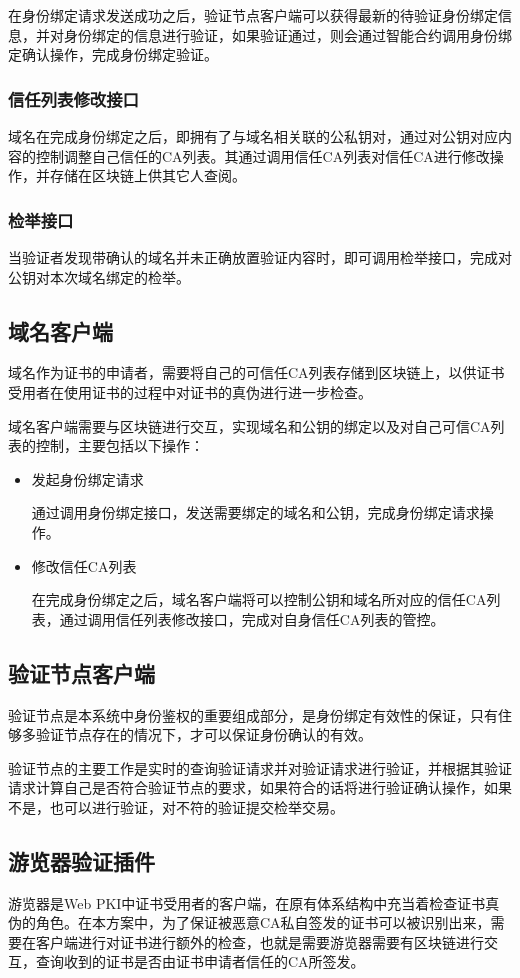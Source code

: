 在身份绑定请求发送成功之后，验证节点客户端可以获得最新的待验证身份绑定信息，并对身份绑定的信息进行验证，如果验证通过，则会通过智能合约调用身份绑定确认操作，完成身份绑定验证。

\subsubsection{信任列表修改接口}

域名在完成身份绑定之后，即拥有了与域名相关联的公私钥对，通过对公钥对应内容的控制调整自己信任的CA列表。其通过调用信任CA列表对信任CA进行修改操作，并存储在区块链上供其它人查阅。


\subsubsection{检举接口}

当验证者发现带确认的域名并未正确放置验证内容时，即可调用检举接口，完成对公钥对本次域名绑定的检举。

\subsection{域名客户端}

域名作为证书的申请者，需要将自己的可信任CA列表存储到区块链上，以供证书受用者在使用证书的过程中对证书的真伪进行进一步检查。

域名客户端需要与区块链进行交互，实现域名和公钥的绑定以及对自己可信CA列表的控制，主要包括以下操作：

\begin{itemize}
	\item 

	发起身份绑定请求

	通过调用身份绑定接口，发送需要绑定的域名和公钥，完成身份绑定请求操作。

	\item 

	修改信任CA列表

	在完成身份绑定之后，域名客户端将可以控制公钥和域名所对应的信任CA列表，通过调用信任列表修改接口，完成对自身信任CA列表的管控。


\end{itemize}

\subsection{验证节点客户端}

验证节点是本系统中身份鉴权的重要组成部分，是身份绑定有效性的保证，只有住够多验证节点存在的情况下，才可以保证身份确认的有效。

验证节点的主要工作是实时的查询验证请求并对验证请求进行验证，并根据其验证请求计算自己是否符合验证节点的要求，如果符合的话将进行验证确认操作，如果不是，也可以进行验证，对不符的验证提交检举交易。


\subsection{游览器验证插件}


游览器是Web PKI中证书受用者的客户端，在原有体系结构中充当着检查证书真伪的角色。在本方案中，为了保证被恶意CA私自签发的证书可以被识别出来，需要在客户端进行对证书进行额外的检查，也就是需要游览器需要有区块链进行交互，查询收到的证书是否由证书申请者信任的CA所签发。

